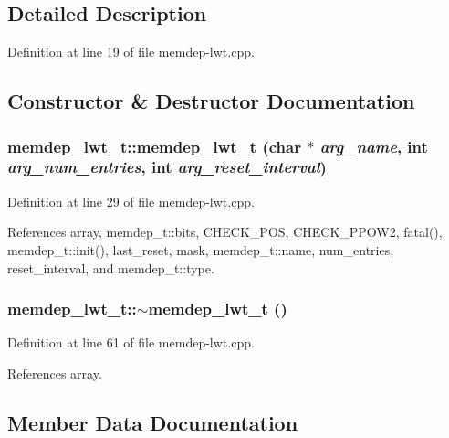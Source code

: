 \subsection{Detailed Description}


Definition at line 19 of file memdep-lwt.cpp.

\subsection{Constructor \& Destructor Documentation}
\subsubsection[{memdep\_\-lwt\_\-t}]{\setlength{\rightskip}{0pt plus 5cm}memdep\_\-lwt\_\-t::memdep\_\-lwt\_\-t (char $\ast$ {\em arg\_\-name}, \/  int {\em arg\_\-num\_\-entries}, \/  int {\em arg\_\-reset\_\-interval})\hspace{0.3cm}{\tt  [inline]}}\label{classmemdep__lwt__t_b6061e198df3d95c4798f9fd1296ec47}




Definition at line 29 of file memdep-lwt.cpp.

References array, memdep\_\-t::bits, CHECK\_\-POS, CHECK\_\-PPOW2, fatal(), memdep\_\-t::init(), last\_\-reset, mask, memdep\_\-t::name, num\_\-entries, reset\_\-interval, and memdep\_\-t::type.
\subsubsection[{$\sim$memdep\_\-lwt\_\-t}]{\setlength{\rightskip}{0pt plus 5cm}memdep\_\-lwt\_\-t::$\sim$memdep\_\-lwt\_\-t ()\hspace{0.3cm}{\tt  [inline]}}\label{classmemdep__lwt__t_cb2602fc2aa4afa0e8e04b2b9dfce952}




Definition at line 61 of file memdep-lwt.cpp.

References array.

\subsection{Member Data Documentation}
